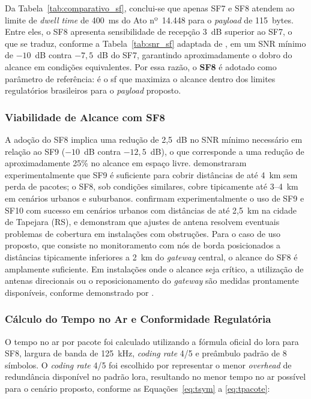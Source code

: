 Da Tabela~\ref{tab:comparativo_sf}, conclui-se que apenas SF7 e SF8 atendem ao
limite de \textit{dwell time} de 400~ms do Ato nº~14.448 para o \textit{\gls{payload}} de 115~bytes.
Entre eles, o SF8 apresenta sensibilidade de recepção 3~dB superior ao SF7, o que
se traduz, conforme a Tabela~\ref{tab:snr_sf} adaptada de , em
um SNR mínimo de $-10$~dB contra $-7,5$~dB do SF7, garantindo aproximadamente
o dobro do alcance em condições equivalentes. Por essa razão, o \textbf{SF8} é adotado
como parâmetro de referência: é o \gls{sf} que maximiza o alcance dentro dos limites
regulatórios brasileiros para o \textit{\gls{payload}} proposto.
 
\subsubsection{Viabilidade de Alcance com SF8}
 
A adoção do SF8 implica uma redução de 2,5~dB no SNR mínimo necessário em relação
ao SF9 ($-10$~dB contra $-12,5$~dB), o que corresponde a uma redução de
aproximadamente 25\% no alcance em espaço livre.  demonstraram
experimentalmente que SF9 é suficiente para cobrir distâncias de até 4~km sem perda de
pacotes; o SF8, sob condições similares, cobre tipicamente até 3--4~km em cenários
urbanos e suburbanos.  confirmam experimentalmente o uso de
SF9 e SF10 com sucesso em cenários urbanos com distâncias de até 2,5~km na cidade
de Tapejara (RS), e demonstram que ajustes de antena resolvem eventuais problemas
de cobertura em instalações com obstruções. Para o caso de uso proposto, que consiste no
monitoramento com nós de borda posicionados a distâncias tipicamente inferiores a 2~km
do \textit{gateway} central, o alcance do SF8 é amplamente suficiente. Em
instalações onde o alcance seja crítico, a utilização de antenas direcionais ou o
reposicionamento do \textit{gateway} são medidas prontamente disponíveis, conforme
demonstrado por .
 
\subsubsection{Cálculo do Tempo no Ar e Conformidade Regulatória}
 
O tempo no ar por pacote foi calculado utilizando a fórmula oficial do \gls{lora} para SF8,
largura de banda de 125~kHz, \textit{coding rate} 4/5 e preâmbulo padrão de 8 símbolos.
O \textit{coding rate} 4/5 foi escolhido por representar o menor \textit{overhead} de redundância
disponível no padrão \gls{lora}, resultando no menor tempo no ar possível para o cenário
proposto, conforme as Equações~\ref{eq:tsym} a \ref{eq:tpacote}:
 

